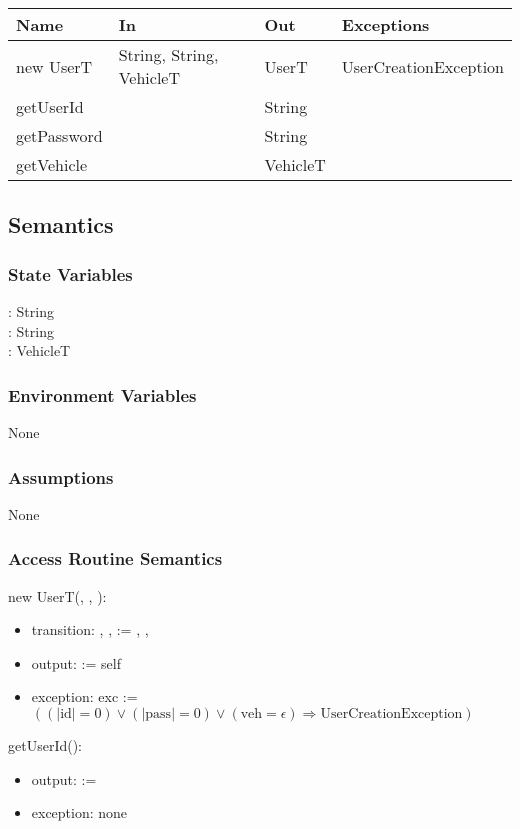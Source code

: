 \documentclass[12pt, titlepage]{article}
\begin{document}
\begin{tabular}{p{2cm} p{5cm} p{2cm} p{4cm}}
\hline
\textbf{Name} & \textbf{In} & \textbf{Out} & \textbf{Exceptions} \\
\hline
new UserT & String, String, VehicleT & UserT & UserCreationException \\
getUserId & ~ & String & ~ \\
getPassword & ~ & String & ~ \\
getVehicle & ~ & VehicleT & ~ \\
\hline
\end{tabular}

\subsection{Semantics}

\subsubsection{State Variables}
: String \\
: String \\
: VehicleT

\subsubsection{Environment Variables}
None

\subsubsection{Assumptions}
None

\subsubsection{Access Routine Semantics}

\noindent new UserT(, , ):
\begin{itemize}
\item transition: , ,  := ,
,  
\item output:  := self
\item exception: exc := $((|\text{id}| = 0) \vee (|\text{pass}| = 0) \vee
(\text{veh} = \epsilon) \Rightarrow \text{UserCreationException})$
\end{itemize}

\noindent getUserId():
\begin{itemize} 
\item output:  :=  
\item exception: none
\end{itemize}
\end{document}

